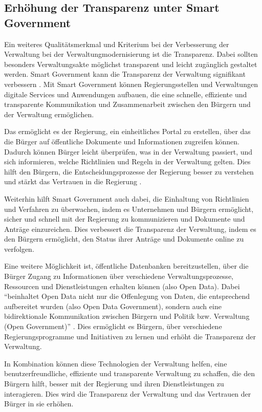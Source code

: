 \subsection{Erhöhung der Transparenz unter Smart Government}
Ein weiteres Qualitätsmerkmal und Kriterium bei der Verbesserung der Verwaltung bei der Verwaltungmodernisierung ist die Transparenz.
Dabei sollten besonders Verwaltungsakte möglichst transparent und leicht zugänglich gestaltet werden.
Smart Government kann die Transparenz der Verwaltung signifikant verbessern \citep[Vgl.][S.87]{Kersting2017}.
Mit Smart Government können Regierungsstellen und Verwaltungen digitale Services und Anwendungen aufbauen, die eine schnelle, effiziente und transparente Kommunikation und Zusammenarbeit zwischen den Bürgern und der Verwaltung ermöglichen. 
\par
Das ermöglicht es der Regierung, ein einheitliches Portal zu erstellen, über das die Bürger auf öffentliche Dokumente und Informationen zugreifen können. 
Dadurch können Bürger leicht überprüfen, was in der Verwaltung passiert, und sich informieren, welche Richtlinien und Regeln in der Verwaltung gelten. 
Dies hilft den Bürgern, die Entscheidungsprozesse der Regierung besser zu verstehen und stärkt das Vertrauen in die Regierung \citep[Vgl.][S.94]{Kersting2017}.
\par
Weiterhin hilft Smart Government auch dabei, die Einhaltung von Richtlinien und Verfahren zu überwachen, indem es Unternehmen und Bürgern ermöglicht, sicher und schnell mit der Regierung zu kommunizieren und Dokumente und Anträge einzureichen. 
Dies verbessert die Transparenz der Verwaltung, indem es den Bürgern ermöglicht, den Status ihrer Anträge und Dokumente online zu verfolgen.
\par
Eine weitere Möglichkeit ist, öffentliche Datenbanken bereitzustellen, über die Bürger Zugang zu Informationen über verschiedene Verwaltungsprozesse, Ressourcen und Dienstleistungen erhalten können (also Open Data).
Dabei ``beinhaltet Open Data nicht nur die Offenlegung von Daten, die entsprechend aufbereitet wurden (also Open Data Government), sondern auch eine bidirektionale Kommunikation zwischen Bürgern und Politik bzw. Verwaltung (Open Government)'' \citep[Vgl.][S.94]{Kersting2017}.
Dies ermöglicht es Bürgern, über verschiedene Regierungsprogramme und Initiativen zu lernen und erhöht die Transparenz der Verwaltung.
\par
In Kombination können diese Technologien der Verwaltung helfen, eine benutzerfreundliche, effiziente und transparente Verwaltung zu schaffen, die den Bürgern hilft, besser mit der Regierung und ihren Dienstleistungen zu interagieren. 
Dies wird die Transparenz der Verwaltung und das Vertrauen der Bürger in sie erhöhen.